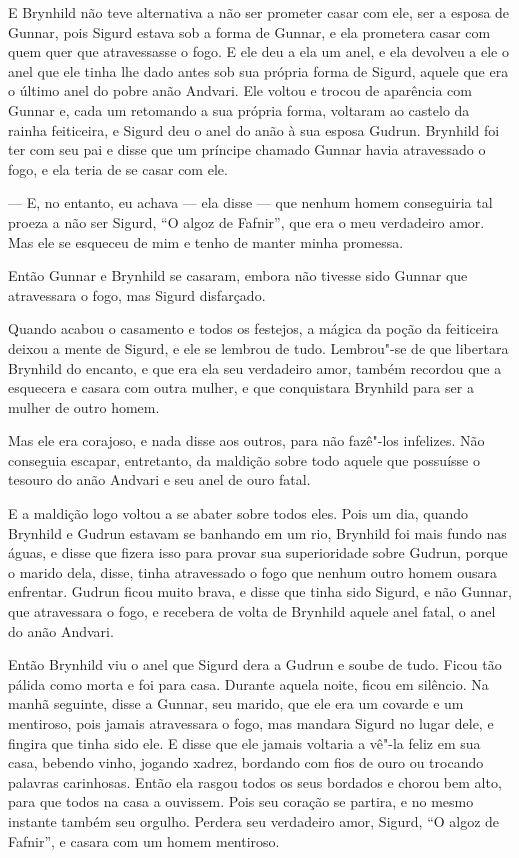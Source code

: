 E Brynhild não teve alternativa a não ser prometer casar com ele, ser
a esposa de Gunnar, pois Sigurd estava sob a forma de Gunnar, e ela
prometera casar com quem quer que atravessasse o fogo. E ele deu a
ela um anel, e ela devolveu a ele o anel que ele tinha lhe dado antes
sob sua própria forma de Sigurd, aquele que era o último anel do
pobre anão Andvari. Ele voltou e trocou de aparência com Gunnar e,
cada um retomando a sua própria forma, voltaram ao castelo da rainha
feiticeira, e Sigurd deu o anel do anão à sua esposa Gudrun. Brynhild
foi ter com seu pai e disse que um príncipe chamado Gunnar havia
atravessado o fogo, e ela teria de se casar com ele. 

--- E, no entanto, eu achava --- ela disse --- que nenhum homem conseguiria
tal proeza a não ser Sigurd, “O algoz de Fafnir”, que era o meu
verdadeiro amor. Mas ele se esqueceu de mim e tenho de manter minha
promessa. 

Então Gunnar e Brynhild se casaram, embora não tivesse sido Gunnar que
atravessara o fogo, mas Sigurd disfarçado. 

Quando acabou o casamento e todos os festejos, a mágica da poção da
feiticeira deixou a mente de Sigurd, e ele se lembrou de tudo.
Lembrou"-se de que libertara Brynhild do encanto, e que era ela seu
verdadeiro amor, também recordou que a esquecera e casara com outra mulher, e
que conquistara Brynhild para ser a mulher de outro homem. 

Mas ele era corajoso, e nada disse aos outros, para não fazê"-los
infelizes. Não conseguia escapar, entretanto, da maldição sobre todo
aquele que possuísse o tesouro do anão Andvari e seu anel de ouro
fatal. 

E a maldição logo voltou a se abater sobre todos eles. Pois um dia,
quando Brynhild e Gudrun estavam se banhando em um rio, Brynhild foi
mais fundo nas águas, e disse que fizera isso para provar sua
superioridade sobre Gudrun, porque o marido dela, disse, tinha
atravessado o fogo que nenhum outro homem ousara enfrentar. Gudrun
ficou muito brava, e disse que tinha sido Sigurd, e não Gunnar, que
atravessara o fogo, e recebera de volta de Brynhild aquele anel
fatal, o anel do anão Andvari. 

Então Brynhild viu o anel que Sigurd dera a Gudrun e soube de tudo.
Ficou tão pálida como morta e foi para casa. Durante aquela noite,
ficou em silêncio. Na manhã seguinte, disse a Gunnar, seu marido,
que ele era um covarde e um mentiroso, pois jamais atravessara o
fogo, mas mandara Sigurd no lugar dele, e fingira que tinha sido ele.
E disse que ele jamais voltaria a vê"-la feliz em sua casa, bebendo
vinho, jogando xadrez, bordando com fios de ouro ou trocando palavras
carinhosas. Então ela rasgou todos os seus bordados e chorou bem alto,
para que todos na casa a ouvissem. Pois seu coração se partira, e no
mesmo instante também seu orgulho. Perdera seu verdadeiro amor,
Sigurd, ``O algoz de Fafnir'', e casara com um homem mentiroso. 

